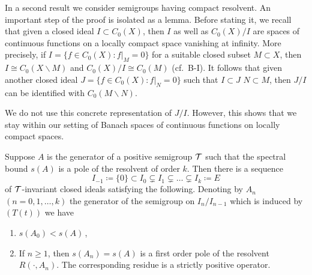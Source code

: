 In a second result we consider semigroups having compact resolvent.
An important step of the proof is isolated as a lemma.
Before stating it, we recall that given a closed ideal $I \subset C_{0}(X)$, then $I$ as well as $C_{0}(X)/I$ are spaces of continuous functions on a locally compact space vanishing at infinity.
More precisely, if $I = \{f \in C_{0}(X) \colon f|_{M} = 0\}$ for a suitable closed subset $M \subset X$, then $I \cong C_{0}(X\backslash M)$ and $C_{0}(X)/I \cong C_{0}(M)$ (cf.\ B-I).
It follows that given another closed ideal $J = \{f \in C_{0}(X) \colon f|_{N} = 0\}$ such that $I \subset J$ \ie $N \subset M$, then $J/I$ can be identified with $C_{0}(M\backslash N)$.

We do not use this concrete representation of $J/I$.
However, this shows that we stay within our setting of Banach spaces of continuous functions on locally compact spaces.
\begin{lemma}\label{lem:b3-2.8}
Suppose $A$ is the generator of a positive semigroup $\mathcal{T}$ such that the spectral bound $s(A)$ is a pole of the resolvent of order $k$.
Then there is a sequence
\begin{equation}\label{eq:b3-2.16}
    I_{-1} \coloneqq \{0\} \subset I_{0} \subsetneq I_{1} \subsetneq \ldots \subsetneq I_{k} \coloneqq E
\end{equation}
of $\mathcal{T}$-invariant closed ideals satisfying the following. 
Denoting by $A_{n}$ $(n = 0,1,\ldots,k)$ the generator of the semigroup on $I_{n}/I_{n-1}$ which is induced by $(T(t))$ we have
\begin{enumerate}[\upshape (i)]
    \item 
    $s(A_{0}) < s(A)$\,,
    
    \item 
    If $n \geq 1$, then $s(A_{n}) = s(A)$ is a first order pole of the resolvent $R(\cdot,A_{n})$. The corresponding residue is a strictly positive operator.
\end{enumerate}
\end{lemma}
